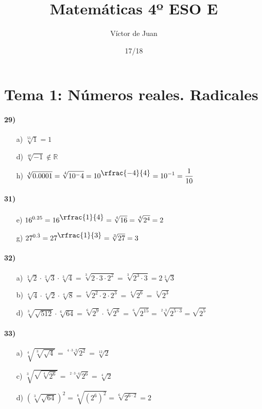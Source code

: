\documentclass[palatino,nosec,nochap]{Docencia}
\title{Matemáticas 4º ESO E}
\author{Víctor de Juan}
\date{17/18}
\begin{document}
\LARGE
\pagestyle{plain}

\section{Tema 1: Números reales. Radicales}

\paragraph{29)}
\begin{itemize}
	\item[a)] $\displaystyle\sqrt[55]{1} = 1$
	\item[d)] $\displaystyle\sqrt[40]{-1} ∉ℝ$
	\item[h)] $\displaystyle\sqrt[4]{0.0001} = \sqrt[4]{10^-4} = 10^{\displaystyle\rfrac{-4}{4}} = 10^{-1} = \frac{1}{10}$
\end{itemize}
\paragraph{31)}
\begin{itemize}
	\item[e)] $\displaystyle16^{0.25} = 16^{\displaystyle\rfrac{1}{4}} = \sqrt[4]{16} = \sqrt[4]{2^4} = 2$
	\item[g)] $\displaystyle27^{0.\hat{3}} = 27^{\displaystyle\rfrac{1}{3}} = \sqrt[3]{27} = 3$
\end{itemize}

\paragraph{32)}
\begin{itemize}
	\item[a)] $\displaystyle\sqrt[3]{2} ·\sqrt[3]{3} · \sqrt[3]{4} = \sqrt[3]{2·3·2^2} = \sqrt[3]{2^3·3} = 2\sqrt[3]{3}$
	\item[b)] $\displaystyle\sqrt[4]{4}·\sqrt[4]{2}·\sqrt[4]{8} = \sqrt[4]{2^2·2·2^3} = \sqrt[4]{2^6} = \sqrt[2]{2^3}$
	\item[d)] $\displaystyle\sqrt[3]{\sqrt{512}}·\sqrt[6]{64} = \sqrt[6]{2^9}·\sqrt[6]{2^6} = \sqrt[6]{2^{15}} = \sqrt[2·3]{2^{5·3}} = \sqrt{2^5}$
\end{itemize}

\paragraph{33)}
\begin{itemize}
	\item[a)] $\displaystyle\sqrt[4]{\sqrt[3]{\sqrt{4}}} = \sqrt[4·3·2]{2^2} = \sqrt[12]{2}$
	\item[c)] $\displaystyle\sqrt[3]{\sqrt{\sqrt[4]{2^6}}} = \sqrt[2·3·4]{2^6} = \sqrt[4]{2}$
	\item[d)] $\displaystyle\left(\sqrt[3]{\sqrt{64}}\right)^2 = \sqrt[6]{(2^6)^2} = \sqrt[6]{2^{6·2}} = 2$
\end{itemize}
\end{document}

